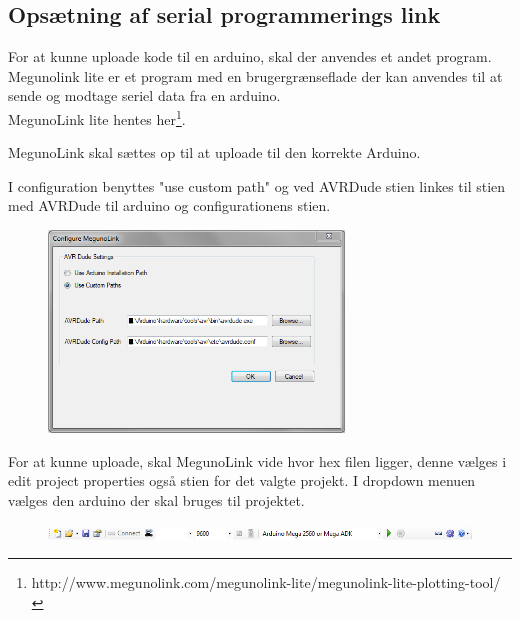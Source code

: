 \newpage

\subsection{Opsætning af serial programmerings link}

For at kunne uploade kode til en arduino, skal der anvendes et andet program.
Megunolink lite er et program med en brugergrænseflade der kan anvendes til at sende og modtage seriel data fra en arduino.\\
MegunoLink lite hentes her\footnote{http://www.megunolink.com/megunolink-lite/megunolink-lite-plotting-tool/}.

MegunoLink skal sættes op til at uploade til den korrekte Arduino. 

I configuration benyttes "use custom path" og ved AVRDude stien linkes til stien med AVRDude til arduino og configurationens stien. 

\begin{figure}[H]
	\centering
	\includegraphics[width=0.7\textwidth]{Billeder/implementation/Howtoguide/megunolink_config.png}
\end{figure}

For at kunne uploade, skal MegunoLink vide hvor hex filen ligger, denne vælges i edit project properties også stien for det valgte projekt.
I dropdown menuen vælges den arduino der skal bruges til projektet.
\begin{figure}[H]
	\centering
	\includegraphics[width=1\textwidth]{Billeder/implementation/Howtoguide/meguno_bar.png}
\end{figure}






